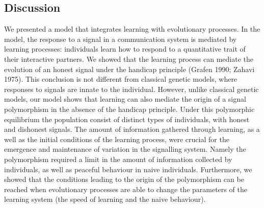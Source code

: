 \documentclass[
  12pt,
]{article}
\begin{document}
\hypertarget{discussion}{%
\subsection{Discussion}\label{discussion}}

We presented a model that integrates learning with evolutionary
processes. In the model, the response to a signal in a communication
system is mediated by learning processes: individuals learn how to
respond to a quantitative trait of their interactive partners. We showed
that the learning process can mediate the evolution of an honest signal
under the handicap principle (Grafen 1990; Zahavi 1975). This conclusion
is not different from classical genetic models, where responses to
signals are innate to the individual. However, unlike classical genetic
models, our model shows that learning can also mediate the origin of a
signal polymorphism in the absence of the handicap principle. Under this
polymorphic equilibrium the population consist of distinct types of
individuals, with honest and dishonest signals. The amount of
information gathered through learning, as a well as the initial
conditions of the learning process, were crucial for the emergence and
maintenance of variation in the signalling system. Namely the
polymorphism required a limit in the amount of information collected by
individuals, as well as peaceful behaviour in naive individuals.
Furthermore, we showed that the conditions leading to the origin of the
polymorphism can be reached when evolutionary processes are able to
change the parameters of the learning system (the speed of learning and
the naive behaviour).
\end{document}
